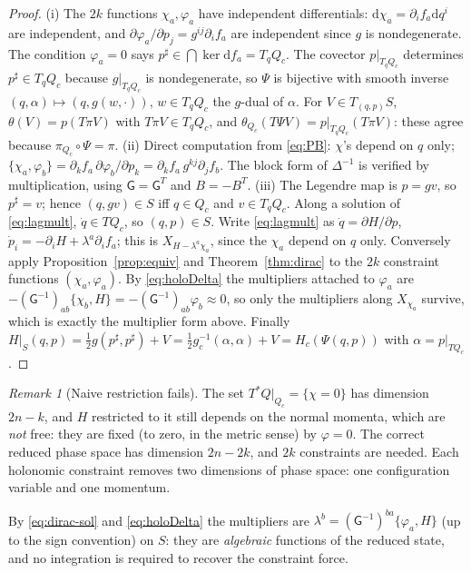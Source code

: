 \documentclass[11pt,a4paper]{article}
\numberwithin{equation}{section}
\theoremstyle{plain}
\theoremstyle{definition}
\theoremstyle{remark}
\newtheorem{remark}[theorem]{Remark}
\newcommand{\pb}[2]{\{#1,#2\}}
\newcommand{\weq}{\mathrel{\approx}}
\newcommand{\dd}{\mathrm{d}}
\newcommand{\inv}{^{-1}}
\begin{document}
\begin{proof}
(i) The $2k$ functions $\chi_a,\varphi_a$ have independent differentials: $\dd\chi_a=\partial_if_a\dd q^i$ are independent, and $\partial\varphi_a/\partial p_j=g^{ij}\partial_if_a$ are independent since $g$ is nondegenerate. The condition $\varphi_a=0$ says $p^\sharp\in\bigcap\ker\dd f_a=T_qQ_c$. The covector $p|_{T_qQ_c}$ determines $p^\sharp\in T_qQ_c$ because $g|_{T_qQ_c}$ is nondegenerate, so $\Psi$ is bijective with smooth inverse $(q,\alpha)\mapsto(q,g(w,\cdot))$, $w\in T_qQ_c$ the $g$-dual of $\alpha$. For $V\in T_{(q,p)}S$, $\theta(V)=p(T\pi V)$ with $T\pi V\in T_qQ_c$, and $\theta_{Q_c}(T\Psi V)=p|_{T_qQ_c}(T\pi V)$: these agree because $\pi_{Q_c}\circ\Psi=\pi$.
(ii) Direct computation from \eqref{eq:PB}: $\chi$'s depend on $q$ only; $\pb{\chi_a}{\varphi_b}=\partial_kf_a\,\partial\varphi_b/\partial p_k=\partial_kf_a\,g^{kj}\partial_jf_b$. The block form of $\Delta^{-1}$ is verified by multiplication, using $\mathsf G=\mathsf G^T$ and $B=-B^T$.
(iii) The Legendre map is $p=gv$, so $p^\sharp=v$; hence $(q,gv)\in S$ iff $q\in Q_c$ and $v\in T_qQ_c$. Along a solution of \eqref{eq:lagmult}, $\dot q\in TQ_c$, so $(q,p)\in S$. Write \eqref{eq:lagmult} as $\dot q=\partial H/\partial p$, $\dot p_i=-\partial_iH+\lambda^a\partial_if_a$; this is $X_{H-\lambda^a\chi_a}$, since the $\chi_a$ depend on $q$ only. Conversely apply Proposition~\ref{prop:equiv} and Theorem~\ref{thm:dirac} to the $2k$ constraint functions $(\chi_a,\varphi_a)$. By \eqref{eq:holoDelta} the multipliers attached to $\varphi_a$ are $-(\mathsf G\inv)_{ab}\pb{\chi_b}{H}=-(\mathsf G\inv)_{ab}\varphi_b\weq0$, so only the multipliers along $X_{\chi_a}$ survive, which is exactly the multiplier form above. Finally $H|_S(q,p)=\tfrac12g(p^\sharp,p^\sharp)+V=\tfrac12 g_c^{-1}(\alpha,\alpha)+V=H_c(\Psi(q,p))$ with $\alpha=p|_{TQ_c}$.
\end{proof}

\begin{remark}[Naive restriction fails]\label{rem:naiverest}
The set $T^*Q|_{Q_c}=\{\chi=0\}$ has dimension $2n-k$, and $H$ restricted to it still depends on the normal momenta, which are \emph{not} free: they are fixed (to zero, in the metric sense) by $\varphi=0$. The correct reduced phase space has dimension $2n-2k$, and $2k$ constraints are needed. Each holonomic constraint removes two dimensions of phase space: one configuration variable and one momentum.
\end{remark}

By \eqref{eq:dirac-sol} and \eqref{eq:holoDelta} the multipliers are $\lambda^b=(\mathsf G\inv)^{ba}\pb{\varphi_a}{H}$ (up to the sign convention) on $S$: they are \emph{algebraic} functions of the reduced state, and no integration is required to recover the constraint force.
\end{document}
